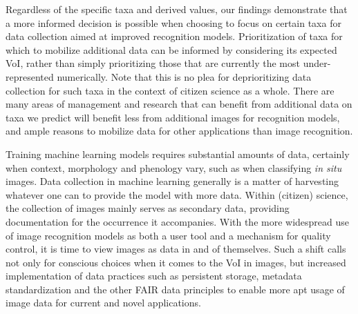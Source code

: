 \documentclass{article}
\begin{document}
Regardless of the specific taxa and derived values, our findings demonstrate that a more informed decision is possible when choosing to focus on certain taxa for data collection aimed at improved recognition models. Prioritization of taxa for which to mobilize additional data can be informed by considering its expected VoI, rather than simply prioritizing those that are currently the most under-represented numerically. Note that this is no plea for deprioritizing data collection for such taxa in the context of citizen science as a whole. There are many areas of management and research that can benefit from additional data on taxa we predict will benefit less from additional images for recognition models, and ample reasons to mobilize data for other applications than image recognition.

Training machine learning models requires substantial amounts of data, certainly when context, morphology and phenology vary, such as when classifying \textit{in situ} images. Data collection in machine learning generally is a matter of harvesting whatever one can to provide the model with more data. Within (citizen) science, the collection of images mainly serves as secondary data, providing documentation for the occurrence it accompanies. With the more widespread use of image recognition models as both a user tool and a mechanism for quality control, it is time to view images as data in and of themselves. Such a shift calls not only for conscious choices when it comes to the VoI in images, but increased implementation of data practices such as persistent storage, metadata standardization and the other FAIR data principles\autocite{Wilkinson2016} to enable more apt usage of image data for current and novel applications.
\end{document}
